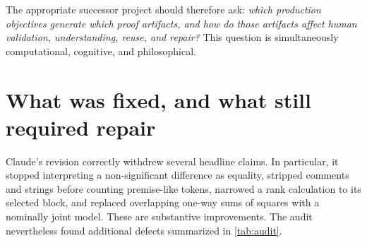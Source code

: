 \documentclass[11pt]{article}
\begin{document}
\noindent The appropriate successor project should therefore ask: \emph{which production
objectives generate which proof artifacts, and how do those artifacts affect human validation,
understanding, reuse, and repair?}  This question is simultaneously computational, cognitive,
and philosophical.

\section{What was fixed, and what still required repair}

Claude's revision correctly withdrew several headline claims.  In particular, it stopped
interpreting a non-significant difference as equality, stripped comments and strings before
counting premise-like tokens, narrowed a rank calculation to its selected block, and replaced
overlapping one-way sums of squares with a nominally joint model.  These are substantive
improvements.  The audit nevertheless found additional defects summarized in
\cref{tab:audit}.
\end{document}
